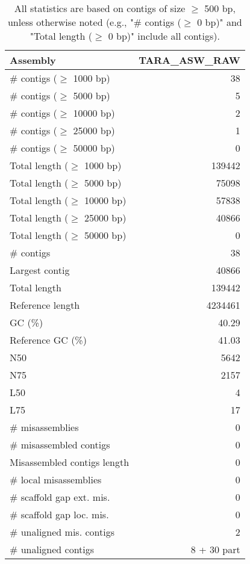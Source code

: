 \documentclass[12pt,a4paper]{article}
\begin{document}
\begin{table}[ht]
\begin{center}
\caption{All statistics are based on contigs of size $\geq$ 500 bp, unless otherwise noted (e.g., "\# contigs ($\geq$ 0 bp)" and "Total length ($\geq$ 0 bp)" include all contigs).}
\begin{tabular}{|l*{1}{|r}|}
\hline
Assembly & TARA\_ASW\_RAW \\ \hline
\# contigs ($\geq$ 1000 bp) & 38 \\ \hline
\# contigs ($\geq$ 5000 bp) & 5 \\ \hline
\# contigs ($\geq$ 10000 bp) & 2 \\ \hline
\# contigs ($\geq$ 25000 bp) & 1 \\ \hline
\# contigs ($\geq$ 50000 bp) & 0 \\ \hline
Total length ($\geq$ 1000 bp) & 139442 \\ \hline
Total length ($\geq$ 5000 bp) & 75098 \\ \hline
Total length ($\geq$ 10000 bp) & 57838 \\ \hline
Total length ($\geq$ 25000 bp) & 40866 \\ \hline
Total length ($\geq$ 50000 bp) & 0 \\ \hline
\# contigs & 38 \\ \hline
Largest contig & 40866 \\ \hline
Total length & 139442 \\ \hline
Reference length & 4234461 \\ \hline
GC (\%) & 40.29 \\ \hline
Reference GC (\%) & 41.03 \\ \hline
N50 & 5642 \\ \hline
N75 & 2157 \\ \hline
L50 & 4 \\ \hline
L75 & 17 \\ \hline
\# misassemblies & 0 \\ \hline
\# misassembled contigs & 0 \\ \hline
Misassembled contigs length & 0 \\ \hline
\# local misassemblies & 0 \\ \hline
\# scaffold gap ext. mis. & 0 \\ \hline
\# scaffold gap loc. mis. & 0 \\ \hline
\# unaligned mis. contigs & 2 \\ \hline
\# unaligned contigs & 8 + 30 part \\ \hline

\end{tabular}
\end{center}
\end{table}
\end{document}
